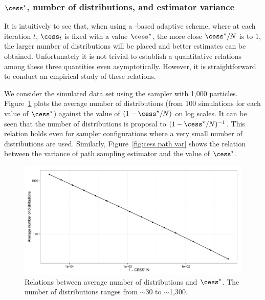 \subsubsection[cess*, number of distributions, and estimator variance]
{$\cess^\star$, number of distributions, and estimator variance}
\label{ssub:cess*, number of distributions, and estimator variance}

It is intuitively to see that, when using a \cess-based adaptive scheme, where
at each iteration $t$, $\cess_t$ is fixed with a value $\cess^\star$, the more
close $\cess^\star/N$ is to $1$, the larger number of distributions will be placed
and better estimates can be obtained. Unfortunately it is not trivial to
establish a quantitative relations among these three quantities even
asymptotically. However, it is straightforward to conduct an empirical study
of these relations.

We consider the simulated \pet data set using the \smc[2] sampler with 1,000
particles. Figure~\ref{fig:cess iter mean} plots the average number of
distributions (from 100 simulations for each value of $\cess^\star$) against the
value of $(1 - \cess^\star/N)$ on log scales. It can be seen that the number of
distributions is proposal to $(1 - \cess^\star/N)^{-1}$. This relation holds even
for sampler configurations where a very small number of distributions are
used. Similarly, Figure~\ref{fig:cess path var} shows the relation between
the variance of path sampling estimator and the value of $\cess^\star$.

\begin{figure}[t]
  \includegraphics[width=\linewidth]{fig/CESS_Iter_Mean}
  \caption{Relations between average number of distributions and
    $\cess^\star$. The number of distributions ranges from $\sim$30 to
    $\sim$1,300.}
  \label{fig:cess iter mean}
\end{figure}

